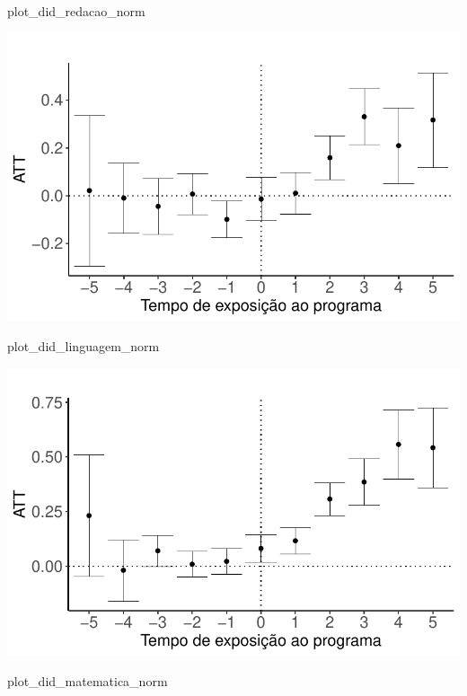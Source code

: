 \documentclass[
  letterpaper,
  DIV=11,
  numbers=noendperiod]{scrartcl}
\newenvironment{Shaded}{\begin{snugshade}}{\end{snugshade}}
\newcommand{\NormalTok}[1]{\textcolor[rgb]{0.00,0.23,0.31}{#1}}
\begin{document}
\begin{Shaded}
\begin{Highlighting}[]
\NormalTok{plot\_did\_redacao\_norm}
\end{Highlighting}
\end{Shaded}

\includegraphics{script_files/figure-latex/unnamed-chunk-22-1.pdf}

\begin{Shaded}
\begin{Highlighting}[]
\NormalTok{plot\_did\_linguagem\_norm}
\end{Highlighting}
\end{Shaded}

\includegraphics{script_files/figure-latex/unnamed-chunk-22-2.pdf}

\begin{Shaded}
\begin{Highlighting}[]
\NormalTok{plot\_did\_matematica\_norm}
\end{Highlighting}
\end{Shaded}
\end{document}
